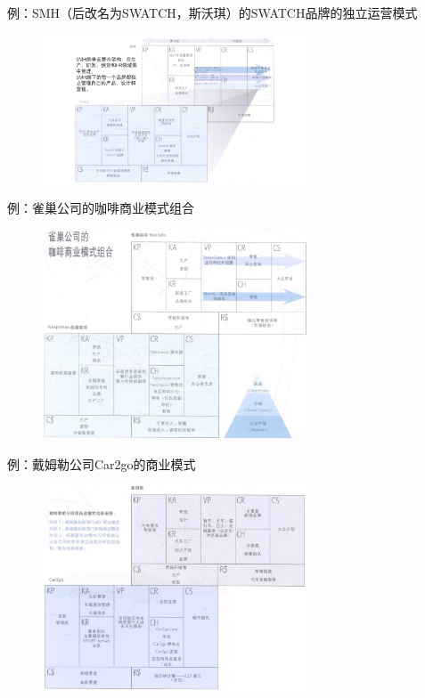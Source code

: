 例：SMH（后改名为SWATCH，斯沃琪）的SWATCH品牌的独立运营模式
\begin{figure}[H]
	\centering
	\vspace{-0.5em}
	\includegraphics[width=0.7\textwidth]{img/SMH的SWATCH品牌的独立运营模式.pdf}
    \vspace{-0.5em}
\end{figure}

例：雀巢公司的咖啡商业模式组合
\begin{figure}[H]
	\centering
	\vspace{-0.5em}
	\includegraphics[width=0.7\textwidth]{img/雀巢公司的咖啡商业模式组合.png}
    \vspace{-0.5em}
\end{figure}

例：戴姆勒公司Car2go的商业模式
\begin{figure}[H]
	\centering
	\vspace{-0.5em}
	\includegraphics[width=0.7\textwidth]{img/戴姆勒公司Car2go的商业模式.png}
    \vspace{-0.5em}
\end{figure}